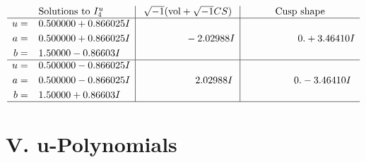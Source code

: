 \documentclass[1p]{elsarticle_modified}
\theoremstyle{definition}
\newcommand{\I}{\sqrt{-1}}
\begin{document}
$$\begin{array}{c|c|c}  
\text{Solutions to }I^u_{4}& \I (\text{vol} + \sqrt{-1}CS) & \text{Cusp shape}\\
 \hline 
\begin{aligned}
u &= \phantom{-}0.500000 + 0.866025 I \\
a &= \phantom{-}0.500000 + 0.866025 I \\
b &= \phantom{-}1.50000 - 0.86603 I\end{aligned}
 & \phantom{-0.000000 } -2.02988 I & \phantom{-0.000000 -}0. + 3.46410 I \\ \hline\begin{aligned}
u &= \phantom{-}0.500000 - 0.866025 I \\
a &= \phantom{-}0.500000 - 0.866025 I \\
b &= \phantom{-}1.50000 + 0.86603 I\end{aligned}
 & \phantom{-0.000000 -}2.02988 I & \phantom{-0.000000 } 0. - 3.46410 I\\
 \hline 
 \end{array}$$\newpage
\newpage\renewcommand{\arraystretch}{1}
\centering \section*{ V. u-Polynomials}
\end{document}
